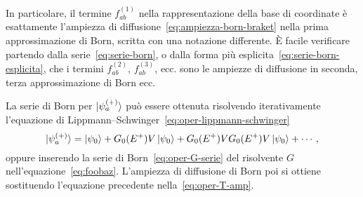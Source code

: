 \documentclass[a4paper,fleqn,twoside,12pt]{article}
\begin{document}
In particolare, il termine $f_{ab}^{(1)}$ nella rappresentazione della base di
coordinate è esattamente l'ampiezza di
diffusione~\eqref{eq:ampiezza-born-braket} nella prima approssimazione di Born,
scritta con una notazione differente.  È facile verificare partendo dalla
serie~\eqref{eq:serie-born}, o dalla forma più
esplicita~\eqref{eq:serie-born-esplicita}, che i termini $f_{ab}^{(2)}$,
$f_{ab}^{(3)}$, ecc. sono le ampiezze di diffusione in seconda, terza
approssimazione di Born ecc.

La serie di Born per $\ket{\psi_{a}^{(+)}}$ può essere ottenuta risolvendo
iterativamente l'equazione di
Lippmann–Schwinger~\eqref{eq:oper-lippmann-schwinger}
\begin{equation}
  \ket{\psi_{a}^{(+)}} = \ket{\psi_{0}} + G_{0}(E^{+})V\ket{\psi_{0}} +
  G_{0}(E^{+})VG_{0}(E^{+})V\ket{\psi_{0}} + \cdots,
\end{equation}
oppure inserendo la serie di Born~\eqref{eq:oper-G-serie} del risolvente $G$
nell'equazione~\eqref{eq:foobaz}.  L'ampiezza di diffusione di Born poi si
ottiene sostituendo l'equazione precedente nella~\eqref{eq:oper-T-amp}.

{}
\printbibliography
\end{document}

